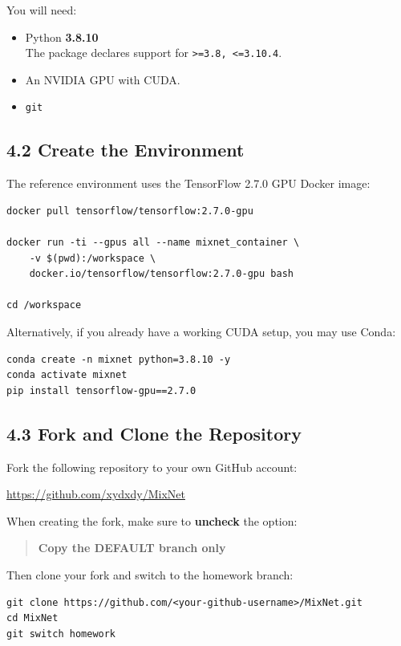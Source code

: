 \documentclass[
  10pt,
]{article}
\begin{document}
You will need:

\begin{itemize}
\item
  Python \textbf{3.8.10}\\
  The package declares support for \texttt{\textgreater{}=3.8,\ \textless{}=3.10.4}.
\item
  An NVIDIA GPU with CUDA.
\item
  \texttt{git}
\end{itemize}

\subsection{4.2 Create the Environment}\label{create-the-environment}

The reference environment uses the TensorFlow 2.7.0 GPU Docker image:

\begin{verbatim}
docker pull tensorflow/tensorflow:2.7.0-gpu

docker run -ti --gpus all --name mixnet_container \
    -v $(pwd):/workspace \
    docker.io/tensorflow/tensorflow:2.7.0-gpu bash

cd /workspace
\end{verbatim}

Alternatively, if you already have a working CUDA setup, you may use
Conda:

\begin{verbatim}
conda create -n mixnet python=3.8.10 -y
conda activate mixnet
pip install tensorflow-gpu==2.7.0
\end{verbatim}

\subsection{4.3 Fork and Clone the
Repository}\label{fork-and-clone-the-repository}

Fork the following repository to your own GitHub account:

\url{https://github.com/xydxdy/MixNet}

When creating the fork, make sure to \textbf{uncheck} the option:

\begin{quote}
\textbf{Copy the DEFAULT branch only}
\end{quote}

Then clone your fork and switch to the homework branch:

\begin{verbatim}
git clone https://github.com/<your-github-username>/MixNet.git
cd MixNet
git switch homework
\end{verbatim}
\end{document}
